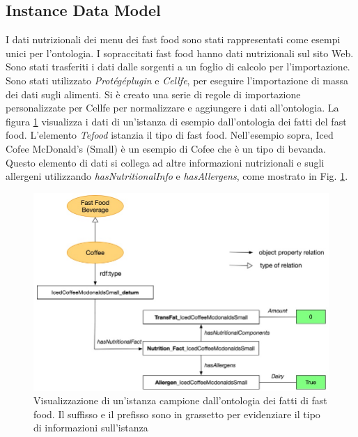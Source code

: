 \subsection{Instance Data Model}
I dati nutrizionali dei menu dei fast food sono stati rappresentati come esempi unici per l'ontologia. I sopraccitati fast food hanno dati nutrizionali sul sito Web. Sono stati trasferiti i dati dalle sorgenti a un foglio di calcolo per l'importazione. Sono stati utilizzato \emph{Protégéplugin} e \emph{Cellfe}, per eseguire l'importazione di massa dei dati sugli alimenti. 
Si è creato una serie di regole di importazione personalizzate per Cellfe per normalizzare e aggiungere i dati all'ontologia. La figura \ref{fig:OntologyInstance} visualizza i dati di un'istanza di esempio dall'ontologia dei fatti del fast food. L'elemento \emph{Tefood} istanzia il tipo di fast food. Nell'esempio sopra, Iced Cofee McDonald's (Small) è un esempio di Cofee che è un tipo di bevanda. Questo elemento di dati si collega ad altre informazioni nutrizionali e sugli allergeni utilizzando \emph{hasNutritionalInfo} e \emph{hasAllergens}, come mostrato in Fig. \ref{fig:OntologyInstance}. 

\begin{figure}[H]
    \centering
    \includegraphics[width=\textwidth]{res/WS_03_Ontology_Instance_Example.jpg}
    \caption{Visualizzazione di un'istanza campione dall'ontologia dei fatti di fast food. Il suffisso e il prefisso sono in grassetto per evidenziare il tipo di informazioni sull'istanza}
     \label{fig:OntologyInstance}
\end{figure}

